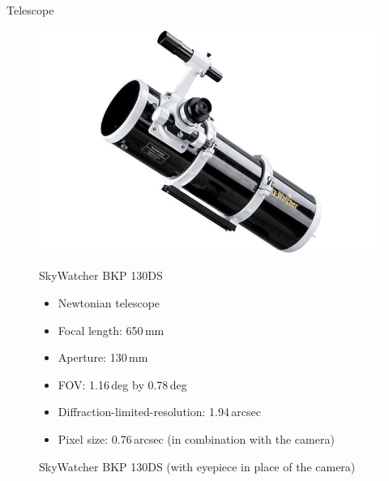 \documentclass[11pt, aspectratio=169]{beamer}
\begin{document}
\begin{frame}{Telescope}
    \begin{figure}[!htb]
        \centering
        \begin{minipage}{.5\textwidth}
            \centering
            \includegraphics[width=\linewidth]{figures/images/SkyWatcher_BKP130DS.jpg}
            \caption*{SkyWatcher BKP 130DS (with eyepiece in place of the camera)}
        \end{minipage}%
        \begin{minipage}{0.5\textwidth}
            SkyWatcher BKP 130DS
            \begin{itemize}%
                \item Newtonian telescope
                \item Focal length: 650\,mm
                \item Aperture: 130\,mm
                \item FOV: 1.16\,deg by 0.78\,deg
                \item Diffraction-limited-resolution: 1.94\,arcsec
                \item Pixel size: 0.76\,arcsec (in \newline combination with the camera)    
            \end{itemize}
        \end{minipage}
    \end{figure}
\end{frame}
\end{document}
